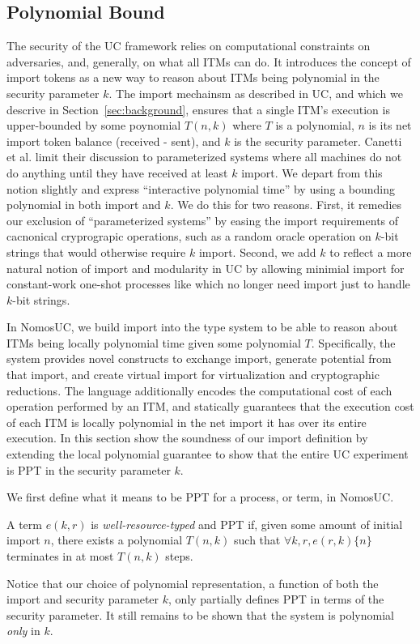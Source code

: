 \subsection{Polynomial Bound}
The security of the UC framework relies on computational constraints on adversaries, and, generally, on what all ITMs can do.
It introduces the concept of import tokens as a new way to reason about ITMs being polynomial in the security parameter $k$. 
The import mechainsm as described in UC, and which we descrive in Section~\ref{sec:background}, ensures that a single ITM's execution is upper-bounded by some poynomial $T(n,k)$ where $T$ is a polynomial, $n$ is its net import token balance (received - sent), and $k$ is the security parameter.
Canetti et al. limit their discussion to parameterized systems where all machines do not do anything until they have received at least $k$ import.
We depart from this notion slightly and express ``interactive polynomial time'' by using a bounding polynomial in both import and $k$.
We do this for two reasons.
First, it remedies our exclusion of ``parameterized systems'' by easing the import requirements of cacnonical cryprograpic operations, such as a random oracle operation on $k$-bit strings that would otherwise require $k$ import. 
Second, we add $k$ to reflect a more natural notion of import and modularity in UC by allowing minimial import for constant-work one-shot processes like \Fcom which no longer need import just to handle $k$-bit strings.

In NomosUC, we build import into the type system to be able to reason about ITMs being locally polynomial time given some polynomial $T$.
Specifically, the system provides novel constructs to exchange import, generate potential from that import, and create virtual import for virtualization and cryptographic reductions.
The language additionally encodes the computational cost of each operation performed by an ITM, and statically guarantees that the execution cost of each ITM is locally polynomial in the net import it has over its entire execution. 
In this section show the soundness of our import definition by extending the local polynomial guarantee to show that the entire UC experiment is PPT in the security parameter $k$.

We first define what it means to be PPT for a process, or term, in NomosUC. 
\begin{ddef}[PPT in $k$]\label{def:ppt}
A term $e(k,r)$ is \emph{well-resource-typed} and PPT if, given some amount of initial import $n$, there exists a polynomial $T(n,k)$ such that $\forall k, r, e(r,k) \{n\}$ terminates in at most $T(n,k)$ steps. 
\end{ddef}
Notice that our choice of polynomial representation, a function of both the import and security parameter $k$, only partially defines PPT in terms of the security parameter. It still remains to be shown that the system is polynomial \emph{only} in $k$.

